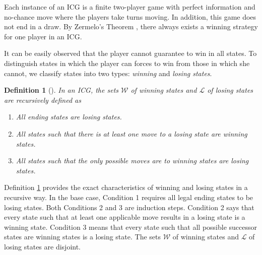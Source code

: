 \documentclass[review]{elsarticle}
\newcommand{\set}[1]{\{ #1 \}}
\newcommand{\winSet}{\mathcal{W}}
\newcommand{\loseSet}{\mathcal{L}}
\newcommand{\constraint}{\mathcal{C}}
\newcommand{\estate}{\mathcal{E}}
\newtheorem{definition}{Definition}
\begin{document}
	Each instance of an ICG is a finite two-player game with perfect information and no-chance move where the players take turns moving.
	In addition, this game does not end in a draw. 
	By Zermelo’s Theorem \cite{Zer1913}, there always exists a winning strategy for one player in an ICG.
	
	
	It can be easily observed that the player cannot guarantee to win in all states.
	To distinguish states in which the player can forces to win from those in which she cannot, we classify states into two types: \textit{winning} and \textit{losing states}.
	\begin{definition}[\cite{Fer2018}] \label{def:wlState} \rm
		In an ICG, the sets $\winSet$ of winning states and $\loseSet$ of losing states are recursively defined as
		\begin{enumerate}
			\item All ending states are losing states.
			\item All states such that there is at least one move to a losing state are winning states.
			\item All states such that the only possible moves are to winning states are losing states.
		\end{enumerate}
		
%
	\end{definition}
	
	Definition \ref{def:wlState} provides the exact characteristics of winning and losing states in a recursive way.
	In the base case, Condition 1 requires all legal ending states to be losing states. Both Conditions 2 and 3 are induction steps.
	Condition 2 says that every state such that at least one applicable move results in a losing state is a winning state.
	Condition 3 means that every state such that all possible successor states are winning states is a losing state.
	The sets $\winSet$ of winning states and $\loseSet$ of losing states are disjoint.
	
\end{document}
